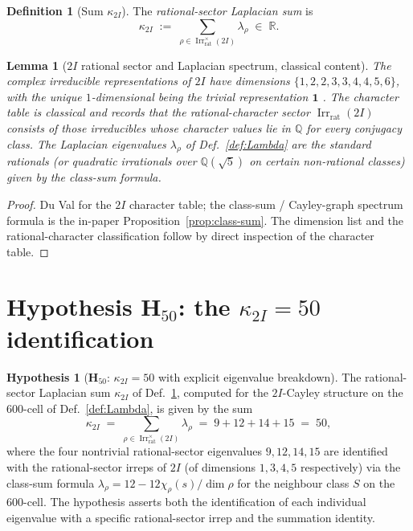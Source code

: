 \documentclass[11pt, a4paper]{amsart}
\newtheorem{lemma}[theorem]{Lemma}
\theoremstyle{definition}
\newtheorem{definition}[theorem]{Definition}
\newtheorem{hypothesis}[theorem]{Hypothesis}
\newcommand{\R}{\mathbb{R}}
\newcommand{\Q}{\mathbb{Q}}
\newcommand{\Irr}{\operatorname{Irr}}
\newcommand{\Hfifty}{\mathbf{H}_{50}}
\newcommand{\kappaTwoI}{\kappa_{2I}}
\newcommand{\Irrrat}{\Irr_{\mathrm{rat}}}
\begin{document}
\begin{definition}[Sum $\kappaTwoI$]
\label{def:kappa}
The \emph{rational-sector Laplacian sum} is
\[
  \kappaTwoI \;:=\; \sum_{\rho \in \Irrrat^\times(2I)}
    \lambda_\rho \;\in\; \R.
\]
\end{definition}

\begin{lemma}[$2I$ rational sector and Laplacian spectrum,
  classical content]
\label{lem:2I-laplacian}
The complex irreducible representations of $2I$ have
dimensions $\{1, 2, 2, 3, 3, 4, 4, 5, 6\}$, with the unique
$1$-dimensional being the trivial representation $\mathbf{1}$
\cite[Ch.~3]{DuVal}. The character table is classical and
records that the rational-character sector
$\Irrrat(2I)$ consists of those irreducibles whose character
values lie in $\Q$ for every conjugacy class. The
Laplacian eigenvalues $\lambda_\rho$ of
Def.~\ref{def:Lambda} are the standard rationals (or
quadratic irrationals over $\Q(\sqrt 5)$ on certain
non-rational classes) given by the class-sum formula.
\end{lemma}

\begin{proof}
Du Val \cite[Ch.~3]{DuVal} for the $2I$ character table; the
class-sum / Cayley-graph spectrum formula is the in-paper
Proposition~\ref{prop:class-sum}. The dimension list and the
rational-character classification follow by direct inspection
of the character table.
\end{proof}

\section{Hypothesis $\Hfifty$: the $\kappaTwoI = 50$
  identification}
\label{sec:H50}

\begin{hypothesis}[$\Hfifty$: $\kappaTwoI = 50$ with explicit eigenvalue breakdown]
\label{hyp:H50}
The rational-sector Laplacian sum $\kappaTwoI$ of
Def.~\ref{def:kappa}, computed for the $2I$-Cayley structure on
the $600$-cell of Def.~\ref{def:Lambda}, is given by the sum
\[
  \kappaTwoI \;=\; \sum_{\rho \in \Irrrat^\times(2I)}
    \lambda_\rho \;=\; 9 + 12 + 14 + 15 \;=\; 50,
\]
where the four nontrivial rational-sector eigenvalues $9, 12,
14, 15$ are identified with the rational-sector irreps of $2I$
(of dimensions $1, 3, 4, 5$ respectively) via the class-sum
formula $\lambda_\rho = 12 - 12\chi_\rho(s)/\dim\rho$ for the
neighbour class $S$ on the $600$-cell. The hypothesis asserts
both the identification of each individual eigenvalue with a
specific rational-sector irrep and the summation identity.
\end{hypothesis}
\end{document}
